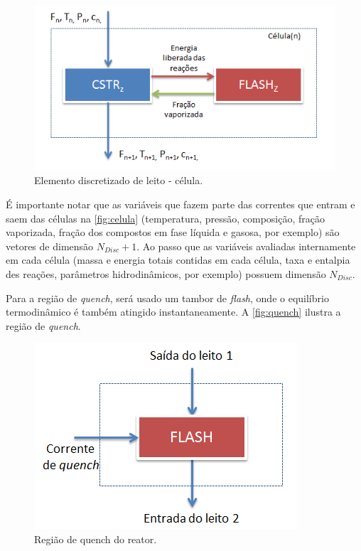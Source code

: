  \begin{figure}[htb]
 \centering \includegraphics[scale=0.75]{images/Chap3/celula.png}
 \caption{Elemento discretizado de leito - célula.}
 \label{fig:celula}
 \end{figure}


É importante notar que as variáveis que fazem parte das correntes que
entram e saem das células na \autoref{fig:celula} (temperatura,
pressão, composição, fração vaporizada, fração dos compostos em fase líquida e
gasosa, por exemplo) são vetores de dimensão $N_{Disc}+1$.
Ao passo que as variáveis avaliadas internamente em cada célula (massa e energia
totais contidas em cada célula, taxa e entalpia des reações, parâmetros
hidrodinâmicos, por exemplo) possuem dimensão $N_{Disc}$.

Para a região de \emph{quench}, será usado um tambor de \emph{flash}, onde o
equilíbrio termodinâmico é também atingido instantaneamente. A
\autoref{fig:quench} ilustra a região de \emph{quench}.

 \begin{figure}[htb]
 \centering \includegraphics[scale=0.75]{images/Chap3/quench.png}
 \caption{Região de quench do reator.}
 \label{fig:quench}
 \end{figure}

